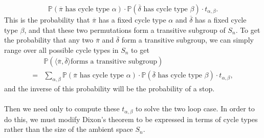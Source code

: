 \[
  \mathbb{P}(\overline\pi\text{ has cycle type
  }\alpha)\cdot\mathbb{P}(\overline\delta\text{ has cycle type
  }\beta)\cdot t_{\alpha, \beta}.
\]
This is the probability that $\overline\pi$ has a fixed cycle type
$\alpha$ and $\overline\delta$ has a fixed cycle type $\beta$, and
that these two permutations form a transitive subgroup of $S_n$. To get the
probability that any two $\overline\pi$ and $\overline\delta$ form a
transitive subgroup, we can simply range over all possible cycle
types in $S_n$ to get
\begin{align*}
  & \mathbb{P}(\langle \overline\pi,\overline\delta \rangle\text{
  forms a transitive subgroup})
  \\= &\sum_{\alpha, \beta}\mathbb{P}(\overline\pi\text{ has cycle
  type }\alpha)\cdot\mathbb{P}(\overline\delta\text{ has cycle type
  }\beta)\cdot t_{\alpha, \beta},
\end{align*}
and the inverse of this probability will be the probability of a stop.
\\\\Then we need only to compute these $t_{\alpha, \beta}$ to solve
the two loop case. In order to do this, we must modify Dixon's
theorem to be expressed in terms of cycle types rather than the size
of the ambient space $S_n$.
